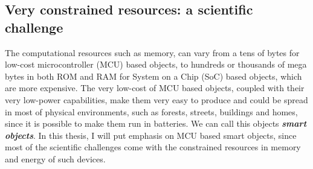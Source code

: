 \subsection{Very constrained resources: a scientific challenge}
The computational resources such as memory, can vary from a tens of bytes for low-cost microcontroller (MCU) based objects, to hundreds or thousands of mega bytes in both ROM and RAM for System on a Chip (SoC) based objects, which are more expensive.
The very low-cost of MCU based objects, coupled with their very low-power capabilities, make them very easy to produce and could be spread in most of physical environments, such as forests, streets, buildings and homes, since it is possible to make them run in batteries.
We can call this objects \textit{\textbf{smart objects}}.
In this thesis, I will put emphasis on MCU based smart objects, since most of the scientific challenges come with the constrained resources in memory and energy of such devices.

